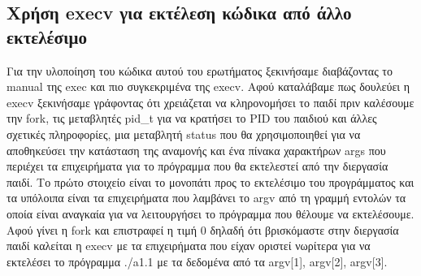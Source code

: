 \documentclass[12pt]{article}
\begin{document}
\subsection{Χρήση \foreignlanguage{english}{execv} για εκτέλεση κώδικα από άλλο
    εκτελέσιμο}

Για την υλοποίηση του κώδικα αυτού του ερωτήματος ξεκινήσαμε διαβάζοντας το
\foreignlanguage{english}{manual} της \foreignlanguage{english}{exec} και
πιο συγκεκριμένα της \foreignlanguage{english}{execv}. Αφού καταλάβαμε πως
δουλεύει
η
\foreignlanguage{english}{execv} ξεκινήσαμε γράφοντας ότι χρειάζεται να
κληρονομήσει το παιδί πριν
καλέσουμε την \foreignlanguage{english}{fork}, τις μεταβλητές
\foreignlanguage{english}{pid\_t} για να
κρατήσει το \foreignlanguage{english}{PID} του παιδιού
και άλλες σχετικές πληροφορίες, μια μεταβλητή \foreignlanguage{english}{status}
που θα χρησιμοποιηθεί για
να αποθηκεύσει την κατάσταση της αναμονής και ένα πίνακα χαρακτήρων
\foreignlanguage{english}{args} που
περιέχει τα επιχειρήματα για το πρόγραμμα που θα εκτελεστεί από την διεργασία
παιδί. Το πρώτο στοιχείο είναι το μονοπάτι
προς το εκτελέσιμο του προγράμματος και τα υπόλοιπα είναι τα επιχειρήματα που
λαμβάνει το \foreignlanguage{english}{argv} από τη
γραμμή εντολών τα οποία είναι αναγκαία για να λειτουργήσει το πρόγραμμα που
θέλουμε να εκτελέσουμε. Αφού γίνει η
\foreignlanguage{english}{fork} και επιστραφεί η τιμή 0 δηλαδή ότι βρισκόμαστε
στην διεργασία παιδί
καλείται η \foreignlanguage{english}{execv} με τα επιχειρήματα
που είχαν οριστεί νωρίτερα για να εκτελέσει το πρόγραμμα
\foreignlanguage{english}{./a1.1} με τα δεδομένα
από τα \foreignlanguage{english}{argv[1], argv[2], argv[3]}.

\pagebreak
\end{document}
